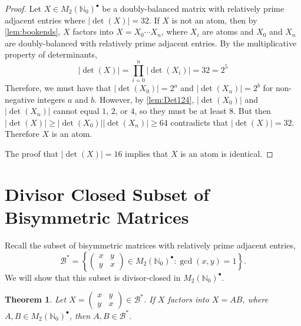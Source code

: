 \documentclass{amsart}
\newcommand{\pmx}[4]{\begin{pmatrix} #1 & #2 \\ #3 & #4 \end{pmatrix}}
\newcommand{\mtwo}{M_2(\mathbb{N}_0)^\bullet}
\newcommand{\B}{\mathcal{B}}
\newcommand{\Bstar}{\mathcal{B}^*}
\newcommand{\absdet}[1]{\left|\det\left( #1 \right)\right|}
\newtheorem{theorem}{Theorem}[section]
\begin{document}
\begin{proof}
    Let $X\in \mtwo$ be a doubly-balanced matrix with relatively prime adjacent entries where $\absdet{X}=32$. If $X$ is not an atom, then by \cref{lem:bookends}, $X$ factors into $X = X_0\cdots X_n$, where $X_i$ are atoms and $X_0$ and $X_n$ are doubly-balanced with relatively prime adjacent entries. By the multiplicative property of determinants,
    \[\absdet X = \prod_{i=0}^n \absdet{X_i}=32=2^5\]
    Therefore, we must have that $\absdet{X_0}=2^a$ and $\absdet{X_n}=2^b$ for non-negative integers $a$ and $b$. However, by \cref{lem:Det124}, $\absdet{X_0}$ and $\absdet{X_n}$ cannot equal $1$, $2$, or $4$, so they must be at least $8$. But then 
    $\absdet{X} \geq \absdet{X_0} \absdet{X_n} \geq 64$ contradicts that $\absdet{X}=32$. Therefore $X$ is an atom.

    The proof that $|\det (X)|=16$ implies that $X$ is an atom is identical.
    
  
\end{proof}




\section{Divisor Closed Subset of Bisymmetric Matrices}\label{sec: divisor closed}

Recall the subset of bisymmetric matrices with relatively prime adjacent entries,
\[\B^*=\left\{\pmx{x}{y}{y}{x}\in \mtwo:\gcd(x,y)=1\right\}.\]
We will show that this subset is divisor-closed in $\mtwo$.

\begin{theorem}\label{thm:bisym factors} Let $X=\pmx{x}{y}{y}{x}\in \Bstar$. If $X$ factors into $X=AB$, where $A,B \in \mtwo$, then $A,B \in \Bstar$. 
\end{theorem}
\end{document}
